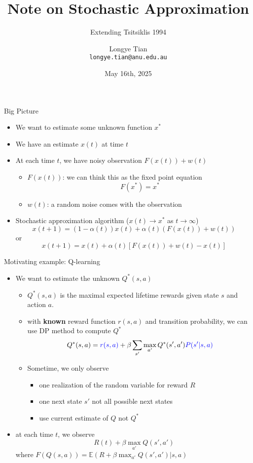 \documentclass[aspectratio=169]{beamer} %
\title[SA]{Note on Stochastic Approximation}
\subtitle{Extending Tsitsiklis 1994}
\author[Longye]{Longye Tian \\ \texttt{longye.tian@anu.edu.au}}
\institute[ANU]{Australian National University\\ School of Economics}
\date{May 16th, 2025}
\begin{document}
\begin{frame}
  \titlepage
\end{frame}
\begin{frame}{Big Picture}
\begin{itemize}
    \item We want to estimate some unknown function $x^*$
    \item We have an estimate $x(t)$ at time $t$
    \item At each time $t$, we have noisy observation $F(x(t))+w(t)$
    \begin{itemize}
        \item $F(x(t))$: we can think this as the fixed point equation
        $$
        F(x^*) = x^*
        $$
        \item $w(t)$: a random noise comes with the observation
    \end{itemize}
    \item Stochastic approximation algorithm ($x(t)\to x^*$ as $t\to\infty$)
    $$
    x(t+1) = (1-\alpha(t)) x(t) + \alpha(t) (F(x(t))+w(t))
    $$
    or
    $$
    x(t+1) = x(t) + \alpha(t) \left[F(x(t)) + w(t) -x(t)\right]
    $$
\end{itemize}
\end{frame}
\begin{frame}{Motivating example: Q-learning}
    \begin{itemize}
        \item We want to estimate the unknown $Q^*(s,a)$
        \begin{itemize}
            \item $Q^*(s,a)$ is the maximal expected lifetime rewards given state $s$ and action $a$.
            \item with \textbf{known} reward function $r(s,a)$ and transition probability, we can use DP method to compute $Q^*$
            $$
            Q^*(s,a) = \textcolor{blue}{r(s,a)} + \beta \sum_{s'} \max_{a'}Q^*(s',a') \textcolor{blue}{P(s'|s,a)}
            $$
            \item Sometime, we only observe
            \begin{itemize}
                \item one realization of the random variable for reward $R$
                \item one next state $s'$ not all possible next states
                \item use current estimate of $Q$ not $Q^*$
            \end{itemize}
        \end{itemize}
        \item at each time $t$, we observe 
        $$
        R(t) + \beta \max_{a'} Q(s',a')
        $$
        where $F(Q(s,a))=\mathbb{E}(R+\beta \max_{a'}Q(s',a')|s,a)$
    \end{itemize}
\end{frame}
\end{document}
